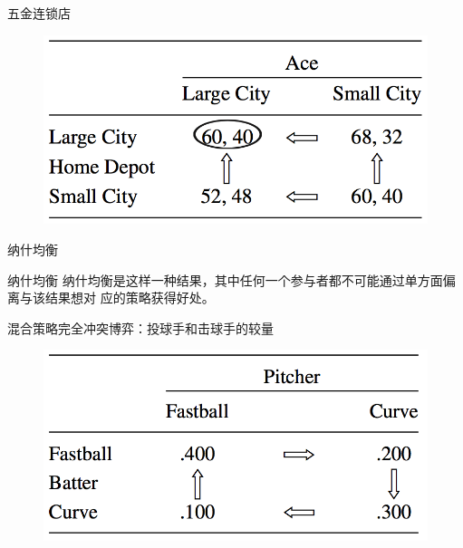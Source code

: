 \documentclass[UTF8]{ctexbeamer}
\begin{document}
\begin{frame}{五金连锁店}
  
  \begin{figure}
    \includegraphics[width=0.8\textwidth{}]{homeace.png}
  \end{figure}

\end{frame}

\begin{frame}{纳什均衡}

  \begin{block}{纳什均衡}
   纳什均衡是这样一种结果，其中任何一个参与者都不可能通过单方面偏离与该结果想对
   应的策略获得好处。 
  \end{block}
  
\end{frame}

\begin{frame}{混合策略完全冲突博弈：投球手和击球手的较量}

  \begin{figure}
    \includegraphics[width=0.8\textwidth{}]{baseball.png}
  \end{figure}
  
\end{frame}
\end{document}
